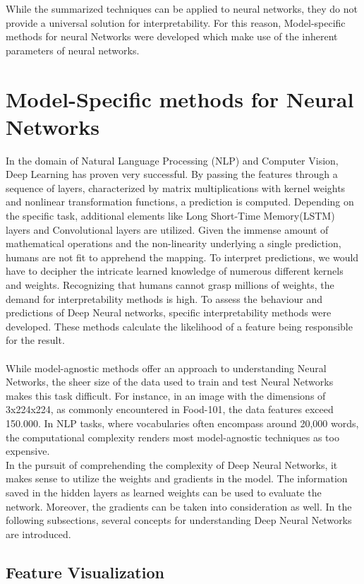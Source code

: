 While the summarized techniques can be applied to neural networks, they do not provide a universal solution for interpretability. For this reason, Model-specific methods for neural Networks were developed which make use of the inherent parameters of neural networks.

\section{Model-Specific methods for Neural Networks}
\label{sec:nni}
In the domain of Natural Language Processing (NLP) and Computer Vision, Deep Learning has proven very successful. By passing the features through a sequence of layers, characterized by matrix multiplications with kernel weights and nonlinear transformation functions, a prediction is computed. Depending on the specific task, additional elements like Long Short-Time Memory(LSTM) layers and Convolutional layers are utilized. Given the immense amount of mathematical operations and the non-linearity underlying a single prediction, humans are not fit to apprehend the mapping. To interpret predictions, we would have to decipher the intricate learned knowledge of numerous different kernels and weights.
Recognizing that humans cannot grasp millions of weights, the demand for interpretability methods is high. To assess the behaviour and predictions of Deep Neural networks, specific interpretability methods were developed. These methods calculate the likelihood of a feature being responsible for the result.
\\\\
While model-agnostic methods offer an approach to understanding Neural Networks, the sheer size of the data used to train and test Neural Networks makes this task difficult. For instance, in an image with the dimensions of 3x224x224, as commonly encountered in Food-101, the data features exceed 150.000. In NLP tasks, where vocabularies often encompass around 20,000 words, the computational complexity renders most model-agnostic techniques as too expensive.
\\
In the pursuit of comprehending the complexity of Deep Neural Networks, it makes sense to utilize the weights and gradients in the model. The information saved in the hidden layers as learned weights can be used to evaluate the network. Moreover, the gradients can be taken into consideration as well. In the following subsections, several concepts for understanding Deep Neural Networks are introduced. 

\subsection{Feature Visualization}
\label{sec:network_dissection}

